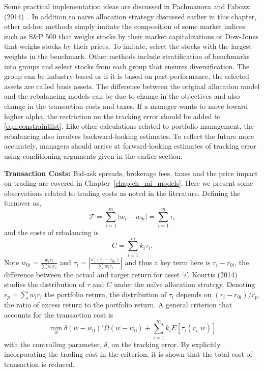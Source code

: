 Some practical implementation ideas are discussed in Pachmanova and Fabozzi (2014)~\cite{pachfab}. In addition to na\"ive allocation strategy discussed earlier in this chapter, other ad-hoc methods simply imitate the composition of some market indices such as S\&P 500 that weighs stocks by their market capitalizations or Dow-Jones that weighs stocks by their prices. To imitate, select the stocks with the largest weights in the benchmark. Other methods include stratification of benchmarks into groups and select stocks from each group that ensures diversification. The group can be industry-based or if it is based on past performance, the selected assets are called basis assets. The difference between the original allocation model and the rebalancing models can be due to change in the objectives and also change in the transaction costs and taxes. If a manager wants to move toward higher alpha, the restriction on the tracking error should be added to \eqref{eqn:constraintlist}. Like other calculations related to portfolio management, the rebalancing also involves backward-looking estimates. To reflect the future more accurately, managers should arrive at forward-looking estimates of tracking error using conditioning arguments given in the earlier section. \twomedskip


\noindent\textbf{Transaction Costs:} Bid-ask spreads, brokerage fees, taxes and the price impact on trading are covered in Chapter~\ref{chap:ch_mi_models}. Here we present some observations related to trading costs as noted in the literature. Defining the turnover as,
	\begin{equation} \label{eqn:turnover}
	\mathcal{T}= \sum_{i=1}^m \lvert w_i - w_{0i} \rvert = \sum_{i=1}^m \tau_i
	\end{equation}
and the costs of rebalancing is
	\begin{equation} \label{eqn:rebalance}
	C= \sum_{i=1}^m k_i \tau_i.
	\end{equation}
Note $w_{0i}= \frac{w_i r_i}{\sum w_i r_i}$ and $\tau_i= \left| \frac{w_i(r_i-r_{0i})}{\sum w_ir_i} \right|$ and thus a key term here is $r_i-r_{0i}$, the difference between the actual and target return for asset `$i$'. Kourtis (2014)~\cite{kourtis} studies the distribution of $\tau$ and $C$ under the na\"ive allocation strategy. Denoting $r_p=\sum w_i r_i$ the portfolio return, the distribution of $\tau_i$ depends on $(r_i-r_{0i})/r_p$, the ratio of excess return to the portfolio return. A general criterion that accounts for the transaction cost is
	\begin{equation} \label{eqn:transcostaccount}
	\min_w \delta (w-w_0)' \Omega(w-w_0) + \sum_{i=1}^m k_i E[\tau_i (r_{i,}w)]
	\end{equation}
with the controlling parameter, $\delta$, on the tracking error. By explicitly incorporating the trading cost in the criterion, it is shown that the total cost of transaction is reduced.


